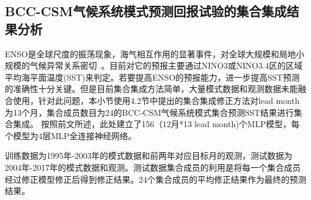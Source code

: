 \subsection{BCC-CSM气候系统模式预测回报试验的集合集成结果分析}
ENSO是全球尺度的振荡现象，海气相互作用的显著事件，对全球大规模和局地小规模的气候异常关系密切~\cite{任福民2012近}。目前对它的预报主要通过NINO3或NINO3.4区的区域平均海平面温度(SST)来判定。若要提高ENSO的预报能力，进一步提高SST预测的准确性十分关键。但是目前集合集成方法简单，大量模式数据和观测数据未能融合使用，针对此问题，本小节使用4.2节中提出的集合集成修正方法对lead month为13个月，集合成员数目为24的BCC-CSM气候系统模式集合预测SST结果进行集合集成。
按照前文所述，此处建立了156（12月*13 lead month)个MLP模型，每个模型为4层MLP全连接神经网络。

训练数据为1995年-2003年的模式数据和前两年对应目标月的观测，测试数据为2004年-2017年的模式数据和观测。测试数据集合成员的利用是将每一个集合成员经过修正模型修正后得到修正结果。24个集合成员的平均修正结果作为最终的预测结果。

